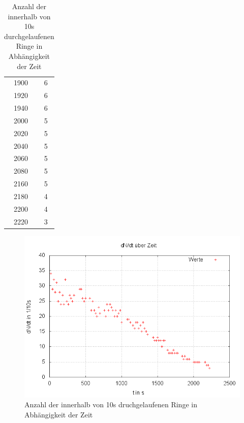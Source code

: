 \begin{table}
\begin{tabular}{c|c}
1900&	6\\ 

1920&	6\\ 

1940&	6\\ 

2000&	5\\ 

2020&	5\\ 

2040&	5\\ 

2060&	5\\ 

2080&	5\\ 

2160&	5\\ 

2180&	4\\ 

2200&	4\\ 

2220&	3\\ 

\end{tabular} 
\caption{Anzahl der innerhalb von 10s durchgelaufenen Ringe in Abhängigkeit der Zeit}
\label{tbl_1}
\end{table}

\begin{figure}
\centering
        \includegraphics[width=.8\textwidth]{images/dNdt(t).png}
\caption{Anzahl der innerhalb von 10s druchgelaufenen Ringe in Abhängigkeit der Zeit}
\label{dNdt(t)}
\end{figure}


